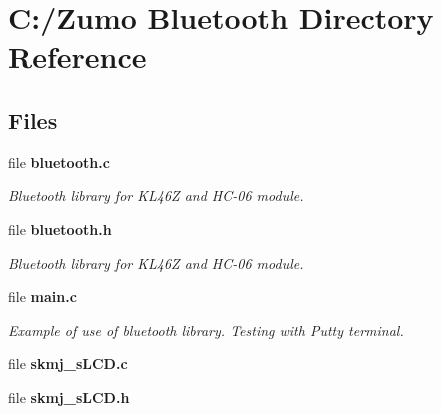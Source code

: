\section{C\+:/\+Zumo Bluetooth Directory Reference}
\label{dir_1294408a2ed96531be041dd3dd23b7d7}
\subsection*{Files}
\begin{DoxyCompactItemize}
\item 
file {\bf bluetooth.\+c}
\begin{DoxyCompactList}\small\item\em Bluetooth library for K\+L46\+Z and H\+C-\/06 module. \end{DoxyCompactList}\item 
file {\bf bluetooth.\+h}
\begin{DoxyCompactList}\small\item\em Bluetooth library for K\+L46\+Z and H\+C-\/06 module. \end{DoxyCompactList}\item 
file {\bf main.\+c}
\begin{DoxyCompactList}\small\item\em Example of use of bluetooth library. Testing with Putty terminal. \end{DoxyCompactList}\item 
file {\bfseries skmj\+\_\+s\+L\+C\+D.\+c}
\item 
file {\bfseries skmj\+\_\+s\+L\+C\+D.\+h}
\end{DoxyCompactItemize}
